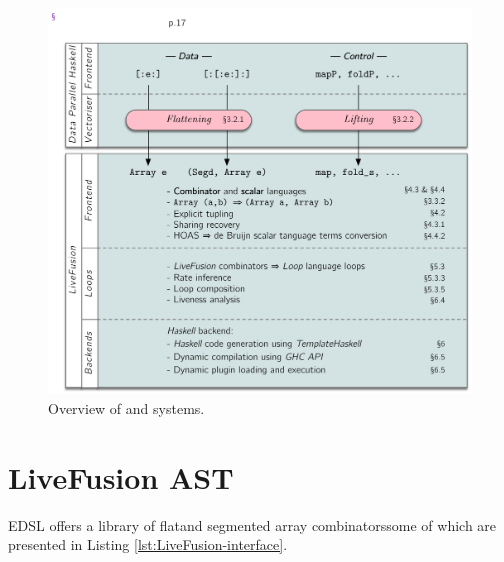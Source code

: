 \documentclass[preamble.tex]{subfiles}
\begin{document}
\begin{figure}
  \includegraphics[width=\textwidth]{img/Overview.pdf}
  \caption{Overview of \DPH and \LiveFusion systems.}
  \label{fig:Overview}
\end{figure}



\clearpage

\section{LiveFusion AST}

\LiveFusion EDSL offers a library of flat\iflatcomb and segmented array combinators\isegcomb some of which are presented in Listing \ref{lst:LiveFusion-interface}.
\end{document}
